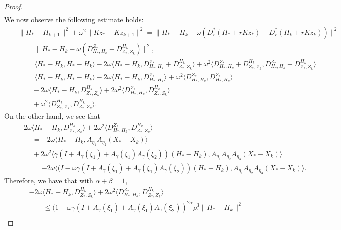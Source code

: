 \begin{itemize}
\begin{proof}
\begin{eqnarray*}
\end{eqnarray*}
We now observe the following estimate holds: 
\begin{eqnarray*}
&& \|H_* - H_{k+1}\|^2 + \omega^2 \|Kz_{*} - Kz_{k+1}\|^2 = \|H_* - H_k - \omega (D_r^{*} (H_* + r K z_*) - D_r^{*} (H_k + r K z_k))\|^2 \\ 
&& \quad = \|H_* - H_k - \omega (D_{H_*,H_k}^{Z_*} + D_{Z_*,Z_k}^{H_k})\|^2,  \\
&& \quad = \langle H_* - H_k, H_* - H_k \rangle - 2 \omega \langle H_* - H_k, D_{H_*,H_k}^{Z_*} + D_{Z_*,Z_k}^{H_k} \rangle + \omega^2 \langle  D_{H_*,H_k}^{Z_*} + D_{Z_*,Z_k}^{H_k},  D_{H_*,H_k}^{Z_*} + D_{Z_*,Z_k}^{H_k}\rangle \\ 
&& \quad = \langle H_* - H_k, H_* - H_k \rangle - 2 \omega \langle H_* - H_k, D_{H_*,H_k}^{Z_*} \rangle + \omega^2 \langle D_{H_*,H_k}^{Z_*}, D_{H_*,H_k}^{Z_*}\rangle \\ 
&& \qquad - 2 \omega \langle H_* - H_k, D_{Z_*,Z_k}^{H_k} \rangle + 2 \omega^2 \langle  
D_{H_*,H_k}^{Z_*}, D_{Z_*,Z_k}^{H_k} \rangle \\
&& \qquad + \omega^2 \langle D_{Z_*,Z_k}^{H_k},  D_{Z_*,Z_k}^{H_k} \rangle. 
\end{eqnarray*}
On the other hand, we see that 
\begin{eqnarray*}
&& -2\omega \langle H_* - H_k, D_{Z_*,Z_k}^{H_k} \rangle + 2\omega^2 \langle D_{H_*,H_k}^{Z_*}, D_{Z_*,Z_k}^{H_k}  \rangle \\
&& \qquad = -2\omega \langle H_* - H_k, A_{\eta_1} A_{\eta_2} (X_*  - X_k) \rangle \\ 
&& \qquad + 2 \omega^2 \langle \gamma (I + A_\gamma (\xi_1) + A_\gamma (\xi_1)A_\gamma(\xi_2)) (H_* - H_k), A_{\eta_1} A_{\eta_2} A_{\eta_3} (X_*  - X_k)  \rangle \\
&& \qquad = - 2\omega \langle (I - \omega \gamma (I + A_\gamma(\xi_1) + A_\gamma (\xi_1)A_\gamma(\xi_2))(H_* - H_k), A_{\eta_1} A_{\eta_2} A_{\eta_3} (X_*  - X_k) \rangle. 
\end{eqnarray*}
Therefore, we have that with $\alpha + \beta = 1$, 
\begin{eqnarray*}
&& -2\omega \langle H_* - H_k, D_{Z_*,Z_k}^{H_k} \rangle + 2\omega^2 \langle D_{H_*,H_k}^{Z_*}, D_{Z_*,Z_k}^{H_k}  \rangle \\
&& \qquad \leq (1 - \omega \gamma (I + A_\gamma(\xi_1) + A_\gamma (\xi_1)A_\gamma(\xi_2))^{2\alpha} \rho_1^3 \|H_* - H_k\|^2 \\

\end{eqnarray*}
\end{proof}
\end{itemize}
